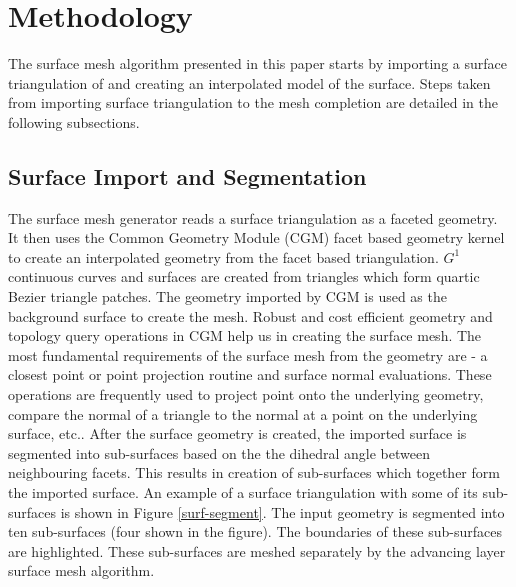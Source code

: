 \documentclass[conf]{new-aiaa}
\begin{document}

\section{Methodology}

The surface mesh algorithm presented in this paper starts by importing a surface triangulation of and creating an interpolated model of the surface. Steps taken from importing surface triangulation to the mesh completion are detailed in the following subsections.

\subsection{Surface Import and Segmentation}

The surface mesh generator reads a surface triangulation as a faceted geometry. It then uses the Common Geometry Module (CGM)\cite{tautges2004common} facet based geometry kernel to create an interpolated geometry from the facet based triangulation. $G^1$ continuous curves and surfaces are created from triangles which form quartic Bezier triangle patches. The geometry imported by CGM is used as the background surface to create the mesh. Robust and cost efficient geometry and topology query operations in CGM help us in creating the surface mesh. The most fundamental requirements of the surface mesh from the geometry are - a closest point or point projection routine and surface normal evaluations. These operations are frequently used to project point onto the underlying geometry, compare the normal of a triangle to the normal at a point on the underlying surface, etc.. After the surface geometry is created, the imported surface is segmented into sub-surfaces based on the the dihedral angle between neighbouring facets. This results in creation of sub-surfaces which together form the imported surface. An example of a surface triangulation with some of its sub-surfaces is shown in Figure \ref{surf-segment}. The input geometry is segmented into ten sub-surfaces (four shown in the figure). The boundaries of these sub-surfaces are highlighted. These sub-surfaces are meshed separately by the advancing layer surface mesh algorithm.

\end{document}
